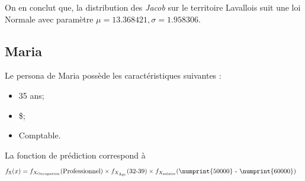 \documentclass[11pt,french]{article}\usepackage[]{graphicx}\usepackage[]{color}
\begin{document}
On en conclut que, la distribution des \emph{Jacob} sur le territoire Lavallois suit une loi Normale avec paramètre $\mu = 13.368421, \sigma = 1.958306$.

\subsection{Maria}
Le persona de Maria possède les caractéristiques suivantes : 
\begin{itemize}
\item 35 ans;
\item{} \$;
\item Comptable.
\end{itemize}
La fonction de prédiction correspond à
\begin{align*}
f_{\mathbb{X}}(x) &= f_{X_{\text{Occupation}}}(\text{Professionnel}) \times f_{X_{\text{Âge}}}(\text{32-39}) \times f_{X_{\text{salaire}}}(\text{\numprint{50000} - \numprint{60000}})
\end{align*}
\end{document}
